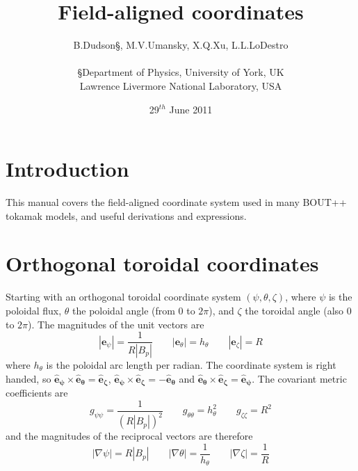 \documentclass[12pt]{article}
\newcommand{\hthe}{\ensuremath{h_\theta}}
\begin{document}
\title{Field-aligned coordinates}
\author{B.Dudson\S, M.V.Umansky\dag, X.Q.Xu\dag, L.L.LoDestro\dag \\
\\
  \S Department of Physics, University of York, UK \\
  \dag Lawrence Livermore National Laboratory, USA}
\date{29$^{th}$ June 2011}
\maketitle

\section{Introduction}

This manual covers the field-aligned coordinate system used in many BOUT++
tokamak models, and useful derivations and expressions.


\section{Orthogonal toroidal coordinates}
\label{sec:coordinates}

Starting with an orthogonal toroidal coordinate system $\left(\psi, \theta, \zeta\right)$, where $\psi$ is the poloidal flux, $\theta$ the poloidal angle (from $0$ to $2\pi$), and $\zeta$ the toroidal angle (also $0$ to $2\pi$). The magnitudes of the unit vectors are
\begin{equation}
\left|\mathbf{e}_\psi\right| = \frac{1}{R\left|B_p\right|} \qquad
\left|\mathbf{e}_\theta\right| = \hthe \qquad
\left|\mathbf{e}_\zeta\right| = R
\label{eq:fluxmags}
\end{equation}
where $\hthe$ is the poloidal arc length per radian. 
The coordinate system is right handed, so $\mathbf{\hat{e}_\psi\times\hat{e}_\theta = \hat{e}_\zeta}$,
$\mathbf{\hat{e}_\psi\times\hat{e}_\zeta = -\hat{e}_\theta}$ and $\mathbf{\hat{e}_\theta\times\hat{e}_\zeta = \hat{e}_\psi}$. The covariant metric coefficients are
\begin{equation}
g_{\psi\psi} = \frac{1}{\left(R\left|B_p\right|\right)^2} \qquad
g_{\theta\theta} = h_\theta^2 \qquad
g_{\zeta\zeta} = R^2
\end{equation}
and the magnitudes of the reciprocal vectors are therefore
\begin{equation}
\left|\nabla\psi\right| = R\left|B_p\right| \qquad
\left|\nabla\theta\right| = \frac{1}{h_\theta} \qquad
\left|\nabla\zeta\right| = \frac{1}{R}
\label{eq:fluxmags2}
\end{equation}
\end{document}
